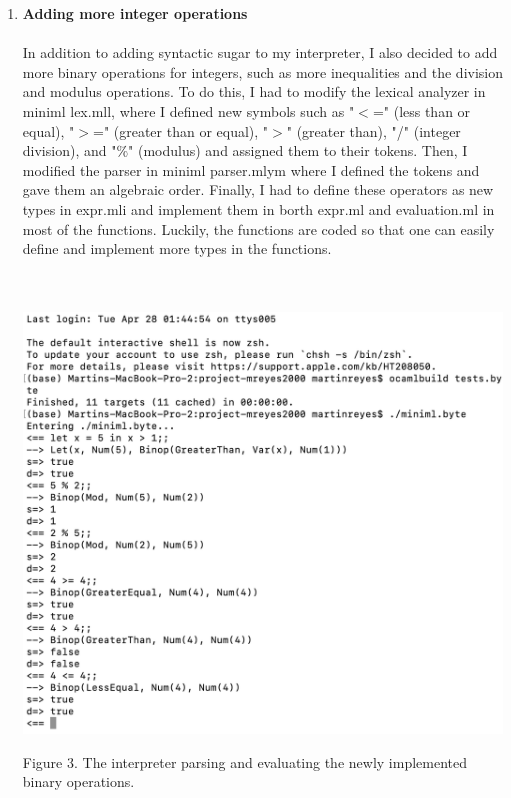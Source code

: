 \documentclass[12pt]{amsart}
\theoremstyle{definition}
\theoremstyle{remark}
\begin{document}
\begin{enumerate}
	\item \textbf{Adding more integer operations}\\
	\\
	In addition to adding syntactic sugar to my interpreter, I also decided to add more binary operations for integers, such as more inequalities and the division and modulus operations. To do this, I had to modify the lexical analyzer in miniml lex.mll, where I defined new symbols such as "$<$=" (less than or equal), "$>$=" (greater than or equal), "$>$" (greater than), "/" (integer division), and "$\%$" (modulus) and assigned them to their tokens. Then, I modified the parser in miniml parser.mlym where I defined the tokens and gave them an algebraic order. Finally, I had to define these operators as new types in expr.mli and implement them in borth expr.ml and evaluation.ml in most of the functions. Luckily, the functions are coded so that one can easily define and implement more types in the functions. \\
	\\
	\\
	\centerline{\includegraphics[scale=0.63]{operations}}
	\centerline{Figure 3. The interpreter parsing and evaluating the newly implemented binary operations.}\\
\\
\end{enumerate}
\end{document}

